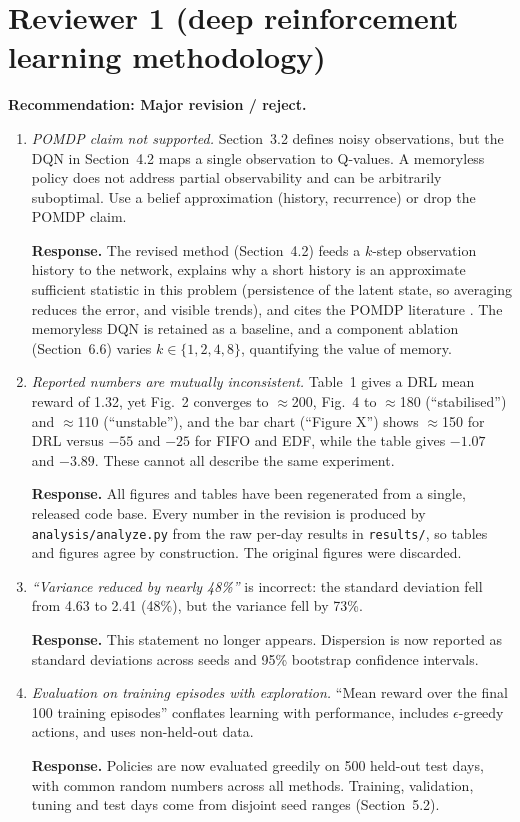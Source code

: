 \documentclass[11pt]{article}
\newcommand{\resp}[1]{\par\noindent\textbf{Response.} #1\par\medskip}
\begin{document}
\section{Reviewer 1 (deep reinforcement learning methodology)}
\textbf{Recommendation: Major revision / reject.}
\begin{enumerate}[label=R1.\arabic*]
\item \textit{POMDP claim not supported.} Section~3.2 defines noisy observations, but the DQN in Section~4.2 maps a single observation to Q-values. A memoryless policy does not address partial observability and can be arbitrarily suboptimal. Use a belief approximation (history, recurrence) or drop the POMDP claim.
\resp{The revised method (Section~4.2) feeds a $k$-step observation history to the network, explains why a short history is an approximate sufficient statistic in this problem (persistence of the latent state, so averaging reduces the error, and visible trends), and cites the POMDP literature \cite{astrom1965,kaelbling1998,singh1994,hausknecht2015,ni2022}. The memoryless DQN is retained as a baseline, and a component ablation (Section~6.6) varies $k\in\{1,2,4,8\}$, quantifying the value of memory.}
\item \textit{Reported numbers are mutually inconsistent.} Table~1 gives a DRL mean reward of 1.32, yet Fig.~2 converges to $\approx$200, Fig.~4 to $\approx$180 (``stabilised'') and $\approx$110 (``unstable''), and the bar chart (``Figure X'') shows $\approx$150 for DRL versus $-55$ and $-25$ for FIFO and EDF, while the table gives $-1.07$ and $-3.89$. These cannot all describe the same experiment.
\resp{All figures and tables have been regenerated from a single, released code base. Every number in the revision is produced by \texttt{analysis/analyze.py} from the raw per-day results in \texttt{results/}, so tables and figures agree by construction. The original figures were discarded.}
\item \textit{``Variance reduced by nearly 48\%''} is incorrect: the standard deviation fell from 4.63 to 2.41 (48\%), but the variance fell by 73\%.
\resp{This statement no longer appears. Dispersion is now reported as standard deviations across seeds and 95\% bootstrap confidence intervals.}
\item \textit{Evaluation on training episodes with exploration.} ``Mean reward over the final 100 training episodes'' conflates learning with performance, includes $\epsilon$-greedy actions, and uses non-held-out data.
\resp{Policies are now evaluated greedily on 500 held-out test days, with common random numbers across all methods. Training, validation, tuning and test days come from disjoint seed ranges (Section~5.2).}

\end{enumerate}
\end{document}
